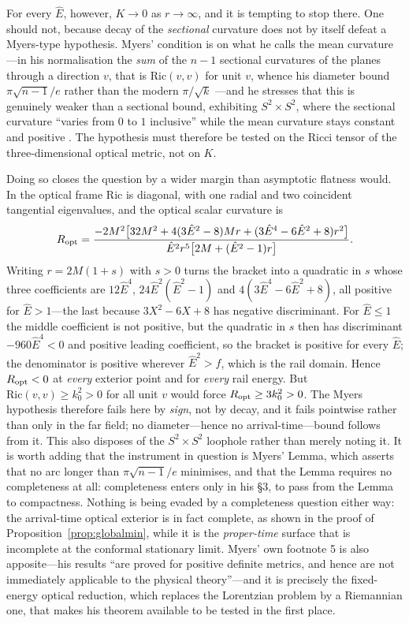 \documentclass[12pt]{iopart}
\theoremstyle{plain}
\theoremstyle{definition}
\theoremstyle{remark}
\newcommand{\Ehat}{\hat E}
\begin{document}
For every $\Ehat$, however, $K\to0$ as $r\to\infty$, and it is tempting to stop
there. One should not, because decay of the \emph{sectional} curvature does not by
itself defeat a Myers-type hypothesis. Myers' condition is on what he calls the
mean curvature---in his normalisation the \emph{sum} of the $n-1$ sectional
curvatures of the planes through a direction $v$, that is $\mathrm{Ric}(v,v)$ for
unit $v$, whence his diameter bound $\pi\sqrt{n-1}/e$ rather than the modern
$\pi/\sqrt k$ \cite[footnotes 3--4]{Myers1941}---and he stresses that this is
genuinely weaker than a sectional bound, exhibiting $S^2\times S^2$, where the
sectional curvature ``varies from $0$ to $1$ inclusive'' while the mean curvature
stays constant and positive \cite[\S4]{Myers1941}. The hypothesis must therefore be
tested on the Ricci tensor of the three-dimensional optical metric, not on $K$.

Doing so closes the question by a wider margin than asymptotic flatness would. In
the optical frame $\mathrm{Ric}$ is diagonal, with one radial and two coincident
tangential eigenvalues, and the optical scalar curvature is
\begin{equation}
    R_{\rm opt}=\frac{-2M^2\big[32M^2+4(3\Ehat^2-8)Mr+(3\Ehat^4-6\Ehat^2+8)r^2\big]}
      {\Ehat^2r^5\big[2M+(\Ehat^2-1)r\big]} .
    \label{eq:optical-scalar}
\end{equation}
Writing $r=2M(1+s)$ with $s>0$ turns the bracket into a quadratic in $s$ whose three
coefficients are $12\Ehat^4$, $24\Ehat^2(\Ehat^2-1)$ and $4(3\Ehat^4-6\Ehat^2+8)$,
all positive for $\Ehat>1$---the last because $3X^2-6X+8$ has negative discriminant. For $\Ehat\le1$ the middle coefficient is not positive, but the quadratic in $s$ then has discriminant $-960\Ehat^4<0$ and positive leading coefficient, so the bracket is positive for every $\Ehat$; the denominator is positive wherever $\Ehat^2>f$, which is the rail domain.
Hence $R_{\rm opt}<0$ at \emph{every} exterior point and for \emph{every} rail
energy. But $\mathrm{Ric}(v,v)\ge k_0^2>0$ for all unit $v$ would force
$R_{\rm opt}\ge3k_0^2>0$. The Myers hypothesis therefore fails here by \emph{sign},
not by decay, and it fails pointwise rather than only in the far field; no
diameter---hence no arrival-time---bound follows from it. This also disposes of the
$S^2\times S^2$ loophole rather than merely noting it. It is worth adding that the
instrument in question is Myers' Lemma, which asserts that no arc longer than
$\pi\sqrt{n-1}/e$ minimises, and that the Lemma requires no completeness at all:
completeness enters only in his \S3, to pass from the Lemma to compactness. Nothing
is being evaded by a completeness question either way: the arrival-time optical
exterior is in fact complete, as shown in the proof of Proposition~\ref{prop:globalmin}, while it is the
\emph{proper-time} surface that is incomplete at the conformal stationary limit. Myers' own footnote 5
is also apposite---his results ``are proved for positive definite metrics, and hence
are not immediately applicable to the physical theory''---and it is precisely the
fixed-energy optical reduction, which replaces the Lorentzian problem by a
Riemannian one, that makes his theorem available to be tested in the first place.
\end{document}
